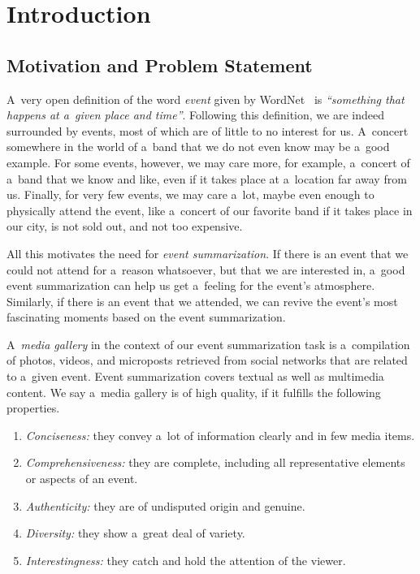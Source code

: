 \chapter{Introduction}
\label{cha:introduction}

\ifpdf
    \graphicspath{{1_introduction/figures/PNG/}{1_introduction/figures/PDF/}{1_introduction/figures/}}
\else
    \graphicspath{{1_introduction/figures/EPS/}{1_introduction/figures/}}
\fi

\section{Motivation and Problem Statement}

A~very open definition of the word \emph{event}
given by WordNet~\cite{fellbaum1998wordnet,miller1995wordnet} is
\emph{``something that happens at a~given place and time''}.
Following this definition,
we are indeed surrounded by events,
most of which are of little to no interest for us.
A~concert somewhere in the world of a~band
that we do not even know may be a~good example.
For some events, however, we may care more, for example,
a~concert of a~band that we know and like,
even if it takes place at a~location far away from us.
Finally, for very few events, we may care a~lot,
maybe even enough to physically attend the event,
like a~concert of our favorite band
if it takes place in our city, is not sold out,
and not too expensive.

All this motivates the need for \emph{event summarization}.
If there is an event that we could not attend
for a~reason whatsoever,
but that we are interested in,
a~good event summarization can help us get a~feeling
for the event's atmosphere.
Similarly, if there is an event that we attended,
we can revive the event's most fascinating moments
based on the event summarization.

A~\emph{media gallery} in the context of
our event summarization task is
a~compilation of photos, videos,
and microposts retrieved from social networks
that are related to a~given event.
Event summarization covers textual
as well as multimedia content.
We say a~media gallery is of high quality,
if it fulfills the following properties.

\begin{enumerate}
  \item \textit{Conciseness:}
        they convey a~lot of information clearly
        and in few media items.
  \item \textit{Comprehensiveness:}
        they are complete, including all representative
        elements or aspects of an event.
  \item \textit{Authenticity:}
        they are of undisputed origin and genuine.
  \item \textit{Diversity:}
        they show a~great deal of variety.
  \item \textit{Interestingness:}
        they catch and hold the attention of the viewer.     
\end{enumerate}

